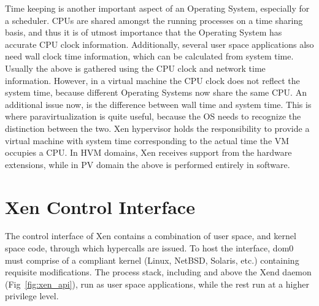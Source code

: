 Time keeping is another important aspect of an Operating System, especially for a scheduler. CPUs are shared amongst the running processes on a time sharing basis, and thus it is of utmost importance that the Operating System has accurate CPU clock information. Additionally, several user space applications also need wall clock time information, which can be calculated from system time. Usually the above is gathered using the CPU clock and network time information. However, in a virtual machine the CPU clock does not reflect the system time, because different Operating Systems now share the same CPU. An additional issue now, is the difference between wall time and system time. This is where paravirtualization is quite useful, because the OS needs to recognize the distinction between the two. Xen hypervisor holds the responsibility to provide a virtual machine with system time corresponding to the actual time the VM occupies a CPU. In HVM domains, Xen receives support from the hardware extensions, while in PV domain the above is performed entirely in software. 

\section{Xen Control Interface}
The control interface of Xen contains a combination of user space, and kernel space code, through which hypercalls are issued. To host the interface, dom0 must comprise of a compliant kernel (Linux, NetBSD, Solaris, etc.) containing requisite modifications. The process stack, including and above the Xend daemon (Fig~\ref{fig:xen_api}), run as user space applications, while the rest run at a higher privilege level. 

